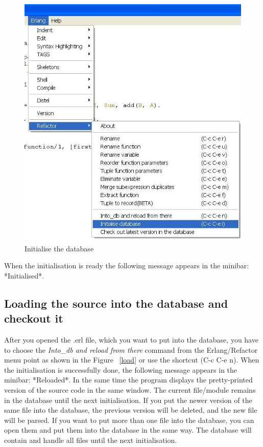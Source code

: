 \documentclass[12pt]{article}
\begin{document}
\begin{center}
\begin{figure}[htbp]
   
    \includegraphics[scale=0.60]{init.jpg}
   \caption{Initialise the database}
  \label{init}
\end{figure}
\end{center}

When the initialisation is ready the following message appears in the minibar: *Initialised*.

\subsection{Loading the source into the database and checkout it}

After you opened the .erl file, which you want to put into the database, 
you have to choose the {\it Into\_db and reload from there} command from the Erlang/Refactor menu point as shown in the Figure ~\ref{load} 
or use the shortcut (C-c C-e n).
When the initialisation is successfully done, the following message appears in the minibar: *Reloaded*. 
In the same time the program displays the pretty-printed version of the source code in the same window.
The current file/module remains in the database until the next initialisation. 
If you put the newer version of the same file into the database, the previous version will be deleted, and  the new file will be parsed.
If you want to put more than one file into the database, you can open them and put them into the database in the same way. 
The database will contain and handle all files until the next initialisation.
\end{document}
